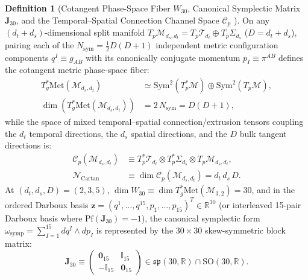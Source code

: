 \documentclass[11pt,a4paper]{article}
\newcommand{\catD}{\text{\textbf{\textcolor{blue!75!black}{[D]}}}}
\theoremstyle{definition}
\newtheorem{definition}[axiom]{Definition}
\theoremstyle{plain}
\theoremstyle{remark}
\begin{document}
\begin{definition}[Cotangent Phase-Space Fiber $W_{30}$, Canonical Symplectic Matrix $\mathbf{J}_{30}$, and the Temporal--Spatial Connection Channel Space $\mathcal{C}_p$ \catD]\label{def:c1_symplectic_j30}
On any $(d_t + d_s)$-dimensional split manifold $T_p\mathcal{M}_{d_s,d_t} = T_p\mathcal{T}_{d_t} \oplus T_p\Sigma_{d_s}$ ($D = d_t + d_s$), pairing each of the $N_{\mathrm{sym}} = \frac{1}{2}D(D+1)$ independent metric configuration components $q^I \equiv g_{AB}$ with its canonically conjugate momentum $p_I \equiv \pi^{AB}$ defines the cotangent metric phase-space fiber:
\begin{align}
T^*_g\mathrm{Met}(\mathcal{M}_{d_s,d_t}) &\simeq \mathrm{Sym}^2(T^*_p\mathcal{M}) \oplus \mathrm{Sym}^2(T_p\mathcal{M}), \nonumber \\[3pt]
\dim\!\left(T^*_g\mathrm{Met}(\mathcal{M}_{d_s,d_t})\right) &= 2\,N_{\mathrm{sym}} = D(D+1), \label{eq:c1_w30_def}
\end{align}
while the space of mixed temporal--spatial connection/extrusion tensors coupling the $d_t$ temporal directions, the $d_s$ spatial directions, and the $D$ bulk tangent directions is:
\begin{align}
\mathcal{C}_p(\mathcal{M}_{d_s,d_t}) &\equiv T^*_p\mathcal{T}_{d_t} \otimes T^*_p\Sigma_{d_s} \otimes T_p\mathcal{M}_{d_s,d_t}, \nonumber \\[3pt]
\mathcal{N}_{\mathrm{Cartan}} &\equiv \dim\mathcal{C}_p(\mathcal{M}_{d_s,d_t}) = d_t\,d_s\,D. \label{eq:c1_cartan_space_def}
\end{align}
At $(d_t, d_s, D) = (2, 3, 5)$, $\dim W_{30} \equiv \dim T^*_g\mathrm{Met}(\mathcal{M}_{3,2}) = 30$, and in the ordered Darboux basis $\mathbf{z} = (q^1,\dots,q^{15}, p_1,\dots,p_{15})^T \in \mathbb{R}^{30}$ (or interleaved 15-pair Darboux basis where $\mathrm{Pf}(\mathbf{J}_{30}) = -1$), the canonical symplectic form $\omega_{\mathrm{symp}} = \sum_{I=1}^{15} dq^I \wedge dp_I$ is represented by the $30\times 30$ skew-symmetric block matrix:
\begin{equation}\label{eq:c1_j30_matrix}
\mathbf{J}_{30} \equiv \begin{pmatrix} \mathbf{0}_{15} & \mathbb{I}_{15} \\ -\mathbb{I}_{15} & \mathbf{0}_{15} \end{pmatrix} \in \mathfrak{sp}(30, \mathbb{R}) \cap \mathrm{SO}(30, \mathbb{R}).
\end{equation}
\end{definition}
\end{document}
